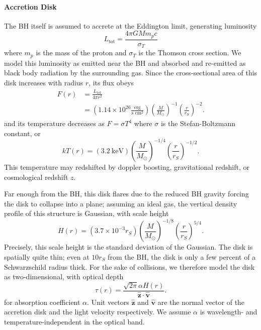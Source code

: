 \documentclass[twocolumn,twocolappendix]{aastex631}
\newcommand{\parens}[1]{\left(#1\right)}
\begin{document}
\paragraph{Accretion Disk} The BH itself is assumed to accrete at the Eddington limit, generating luminosity 
\begin{equation}
  L_\text{tot} = \frac{4\pi GMm_pc}{\sigma_T}
\end{equation}
where $m_p$ is the mass of the proton and $\sigma_T$ is the Thomson cross section.
We model this luminosity as emitted near the BH and absorbed and re-emitted as black body radiation by the surrounding gas. Since the cross-sectional area of this disk increases with radius $r$, its flux obeys
\begin{equation}
  \begin{split}
    F(r) &= \frac{L_\text{tot}}{4\pi r^2} \\&= \parens{1.14\times10^{26}\frac{\text{erg}}{\text{s\ cm}^2}}\parens{\frac{M}{M_\odot}}^{-1}\parens{\frac{r}{r_S}}^{-2}.
  \end{split}
\end{equation}
and its temperature decreases as $F = \sigma T^4$ where $\sigma$ is the Stefan-Boltzmann constant, or
\begin{equation}
    kT(r) =(3.2\ \text{keV})\parens{\frac{M}{M_\odot}}^{-1/4}\parens{\frac{r}{r_S}}^{-1/2}.
    \label{eqn:disk-temp}
\end{equation}
This temperature may redshifted by doppler boosting, gravitational redshift, or cosmological redshift $z$.

Far enough from the BH, this disk flares due to the reduced BH gravity forcing the disk to collapse into a plane; assuming an ideal gas, the vertical density profile of this structure is Gaussian, with scale height
\begin{equation}
  H(r) = (3.7 \times 10^{-3} r_S) \parens{\frac{M}{M_\odot}}^{-1/8}\parens{\frac{r}{r_S}}^{5/4}.
\end{equation}
Precisely, this scale height is the standard deviation of the Gaussian. The disk is spatially quite thin; even at $10 r_S$ from the BH, the disk is only a few percent of a Schwarzschild radius thick. For the sake of collisions, we therefore model the disk as two-dimensional, with optical depth
\begin{equation}
  \tau(r) = \frac{\sqrt{2\pi}\alpha H(r)}{\hat{\mathbf z} \cdot \hat{\mathbf v}}.
\end{equation}
for absorption coefficient $\alpha$. Unit vectors $\hat{\mathbf z}$ and $\hat{\mathbf v}$ are the normal vector of the accretion disk and the light velocity respectively. We assume $\alpha$ is wavelength- and temperature-independent in the optical band.
\end{document}
